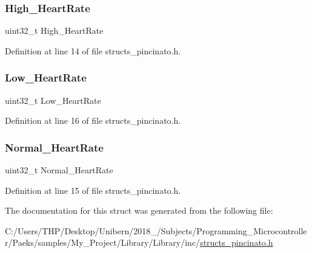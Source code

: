 \mbox{\label{struct_table_a083b719ad6c79f4ae24629ff524568c5}} 
\subsubsection{\texorpdfstring{High\+\_\+\+Heart\+Rate}{High\_HeartRate}}
{\footnotesize\ttfamily uint32\+\_\+t High\+\_\+\+Heart\+Rate}



Definition at line 14 of file structs\+\_\+pincinato.\+h.

\mbox{\label{struct_table_abee6357a367856ae631545d1499ae7cd}} 
\subsubsection{\texorpdfstring{Low\+\_\+\+Heart\+Rate}{Low\_HeartRate}}
{\footnotesize\ttfamily uint32\+\_\+t Low\+\_\+\+Heart\+Rate}



Definition at line 16 of file structs\+\_\+pincinato.\+h.

\mbox{\label{struct_table_a2639bf590ecf1e2847a7cc426eb9286b}} 
\subsubsection{\texorpdfstring{Normal\+\_\+\+Heart\+Rate}{Normal\_HeartRate}}
{\footnotesize\ttfamily uint32\+\_\+t Normal\+\_\+\+Heart\+Rate}



Definition at line 15 of file structs\+\_\+pincinato.\+h.



The documentation for this struct was generated from the following file\+:\begin{DoxyCompactItemize}
\item 
C\+:/\+Users/\+T\+H\+P/\+Desktop/\+Unibern/2018\+\_/\+Subjects/\+Programming\+\_\+\+Microcontroller/\+Paeks/samples/\+My\+\_\+\+Project/\+Library/\+Library/inc/\mbox{\hyperlink{structs__pincinato_8h}{structs\+\_\+pincinato.\+h}}\end{DoxyCompactItemize}
